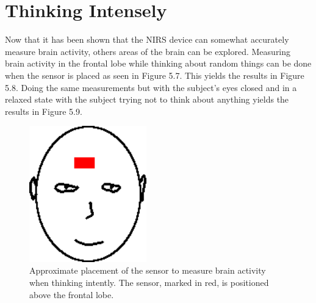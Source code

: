 \section{Thinking Intensely}
Now that it has been shown that the NIRS device can somewhat accurately measure brain activity, others areas of the brain can be explored. Measuring brain activity in the frontal lobe while thinking about random things can be done when the sensor is placed as seen in Figure 5.7. This yields the results in Figure 5.8. Doing the same measurements but with the subject's eyes closed and in a relaxed state with the subject trying not to think about anything yields the results in Figure 5.9.

\begin{figure}[htp]
\centering
\includegraphics[width=2in]{sensorfront.png}
\caption[Placement of Sensor to measure Frontal Lobe]{Approximate placement of the sensor to measure brain activity when thinking intently. The sensor, marked in red, is positioned above the frontal lobe.}
\end{figure}

